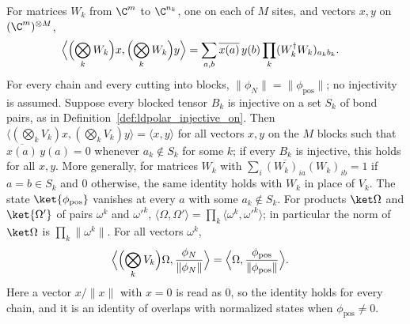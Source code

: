 \begin{lemma}
    \label{thm:ldp_chain_block_iso_inner}
    \leanok
    For matrices $W_k$ from $\C^m$ to $\C^{n_k}$, one on each of $M$ sites,
    and vectors $x,y$ on $(\C^m)^{\otimes M}$,
    \begin{align}
        \Bigl\langle\Bigl(\bigotimes_kW_k\Bigr)x,
        \Bigl(\bigotimes_kW_k\Bigr)y\Bigr\rangle
         & =\sum_{a,b}\overline{x(a)}\,y(b)\prod_k(W_k^\dagger W_k)_{a_kb_k}.
        \label{eq:ldp_chain_block_gram}
    \end{align}
    For every chain and every cutting into blocks,
    $\lVert\phi_N\rVert=\lVert\phi_{\mathrm{pos}}\rVert$; no injectivity is
    assumed.
    Suppose every blocked tensor $B_k$ is injective on a set $S_k$ of bond
    pairs, as in Definition~\ref{def:ldpolar_injective_on}. Then
    $\langle(\bigotimes_kV_k)x,(\bigotimes_kV_k)y\rangle=\langle x,y\rangle$
    for all vectors $x,y$ on the $M$ blocks such that
    $\overline{x(a)}\,y(a)=0$ whenever $a_k\notin S_k$ for some $k$; if every
    $B_k$ is injective, this holds for all $x,y$. More generally, for
    matrices $W_k$ with $\sum_i\overline{(W_k)_{ia}}(W_k)_{ib}=1$ if
    $a=b\in S_k$ and $0$ otherwise, the same identity holds with $W_k$ in place
    of $V_k$. The state $\ket{\phi_{\mathrm{pos}}}$ vanishes at every $a$ with
    some $a_k\notin S_k$. For products
    $\ket\Omega$ and $\ket{\Omega'}$ of pairs $\omega^k$ and $\omega'^k$,
    $\langle\Omega,\Omega'\rangle=\prod_k\langle\omega^k,\omega'^k\rangle$; in
    particular the norm of $\ket\Omega$ is $\prod_k\lVert\omega^k\rVert$.
    For all vectors $\omega^k$,
    \begin{align}
        \Bigl\langle\Bigl(\bigotimes_kV_k\Bigr)\Omega,
        \frac{\phi_N}{\lVert\phi_N\rVert}\Bigr\rangle
         & =\Bigl\langle\Omega,
        \frac{\phi_{\mathrm{pos}}}{\lVert\phi_{\mathrm{pos}}\rVert}\Bigr\rangle.
        \label{eq:ldp_chain_block_iso_inner}
    \end{align}
    Here a vector $x/\lVert x\rVert$ with $x=0$ is read as $0$, so the identity
    holds for every chain, and it is an identity of overlaps with normalized
    states when $\phi_{\mathrm{pos}}\ne0$.
\end{lemma}
